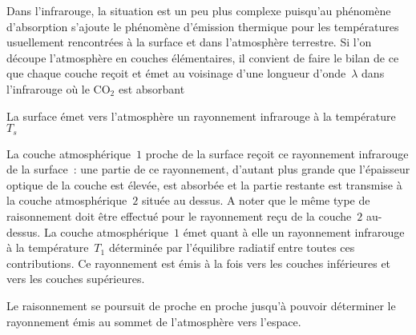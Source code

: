 \sk
Dans l'infrarouge, la situation est un peu plus complexe puisqu'au phénomène d'absorption s'ajoute le phénomène d'émission thermique pour les températures usuellement rencontrées à la surface et dans l'atmosphère terrestre. Si l'on découpe l'atmosphère en couches élémentaires, il convient de faire le bilan de ce que chaque couche reçoit et émet au voisinage d'une longueur d'onde~$\lambda$ dans l'infrarouge où le CO$_2$ est absorbant
\begin{citemize}
\item La surface émet vers l'atmosphère un rayonnement infrarouge à la température~$T_s$
\item La couche atmosphérique~$1$ proche de la surface reçoit ce rayonnement infrarouge de la surface~: une partie de ce rayonnement, d'autant plus grande que l'épaisseur optique de la couche est élevée, est absorbée et la partie restante est transmise à la couche atmosphérique~$2$ située au dessus. A noter que le même type de raisonnement doit être effectué pour le rayonnement reçu de la couche~$2$ au-dessus. La couche atmosphérique~$1$ émet quant à elle un rayonnement infrarouge à la température~$T_1$ déterminée par l'équilibre radiatif entre toutes ces contributions. Ce rayonnement est émis à la fois vers les couches inférieures et vers les couches supérieures.
\item Le raisonnement se poursuit de proche en proche jusqu'à pouvoir déterminer le rayonnement émis au sommet de l'atmosphère vers l'espace.
\end{citemize}

